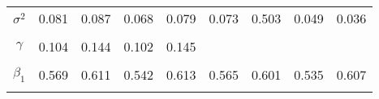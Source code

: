 \begin{footnotesize}
\begin{singlespace}
\begin{tabular}{ccccccccc}
$ \sigma^{2} $ & 0.081 & 0.087 & 0.068 & 0.079 & 0.073 & 0.503 & 0.049 & 0.036 \\ 
 & \begin{tiny} [0.072,0.09] \end{tiny}  & \begin{tiny} [0.077,0.098] \end{tiny}  & \begin{tiny} [0.06,0.076] \end{tiny}  & \begin{tiny} [0.068,0.089] \end{tiny}  & \begin{tiny} [0.056,0.091] \end{tiny}  & \begin{tiny} [0.44,0.574] \end{tiny}  & \begin{tiny} [0.036,0.061] \end{tiny}  & \begin{tiny} [0.025,0.048] \end{tiny}  \\ 
$\gamma$ & 0.104 & 0.144 & 0.102 & 0.145 &  &  &  &  \\ 
 & \begin{tiny} [0.097,0.11] \end{tiny}  & \begin{tiny} [0.139,0.15] \end{tiny}  & \begin{tiny} [0.095,0.109] \end{tiny}  & \begin{tiny} [0.14,0.152] \end{tiny}  &  &  &  &  \\ 
$ \beta_{1} $ & 0.569 & 0.611 & 0.542 & 0.613 & 0.565 & 0.601 & 0.535 & 0.607 \\ 
 & \begin{tiny} [0.501,0.639] \end{tiny}  & \begin{tiny} [0.54,0.685] \end{tiny}  & \begin{tiny} [0.475,0.61] \end{tiny}  & \begin{tiny} [0.539,0.687] \end{tiny}  & \begin{tiny} [0.452,0.679] \end{tiny}  & \begin{tiny} [0.506,0.696] \end{tiny}  & \begin{tiny} [0.421,0.649] \end{tiny}  & \begin{tiny} [0.468,0.75] \end{tiny}  \\ 

\end{tabular}
\end{singlespace}
\end{footnotesize}
